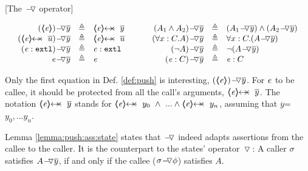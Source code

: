 \begin{definition}
\label{def:push}
[The $\FIXSymbolA$  operator]  

$
\begin{array}{c}
\begin{array}{l}
\begin{array}{rclcrcl}
  \PushAS y {(\inside \re)} & \triangleq &  \protectedFrom \re {\overline {y} }
  & \ \ \  \ &
  \PushAS y   {(A_1  \wedge  A_2)} & \triangleq &  (\PushAS y  { A_1})  \wedge  ( \PushAS y  {A_2} )  
\\ 
 \PushAS y {(\protectedFrom \re {\overline {u}})} &  \triangleq& \protectedFrom \re {\overline {u}} 
  & &
 \PushAS y  {(\forall x:C.A)} & \triangleq & \forall x:C.({\PushAS y A} )  
  \\  
  \PushAS y  {(\external \re)} &  \triangleq & {\external \re}  %
  & & 
  \PushAS y  {(\neg A)} &  \triangleq & \neg( {\PushAS y A} )  
    \\
     \PushAS y  {\re} &  \triangleq&   \re %
    & &
    \PushAS y  {(\re:C)} &  \triangleq&   \re:C 
 \end{array}
\end{array}
\end{array}
$
\label{f:Push}
\end{definition}

Only the first equation in  Def.  \ref{def:push}  is interesting,
  $\PushAS y {(\inside \re)}$.  
For $\re$ to be  callee, it should be protected from all the call's arguments,
\ie  $\protectedFrom {\re} {\overline {y}}$. 
The notation $\protectedFrom {\re} {\overline {y}}$   stands for $\protectedFrom \re {y_0}\  \wedge\  ...  \wedge \protectedFrom \re {y_n}$, assuming that $\overline y$=${y_0, ... y_n}$.

Lemma \ref{lemma:push:ass:state}  states that  $\FIXSymbolA$ indeed adapts assertions from the callee to the caller.
It is the counterpart to the states' operator $\pushSymbol$:
A caller   $\sigma$ satisfies  $\PushAS y A$, if and only if the callee   ($\PushASLong {\phi} {\sigma}$) %
satisfies $A$.  

